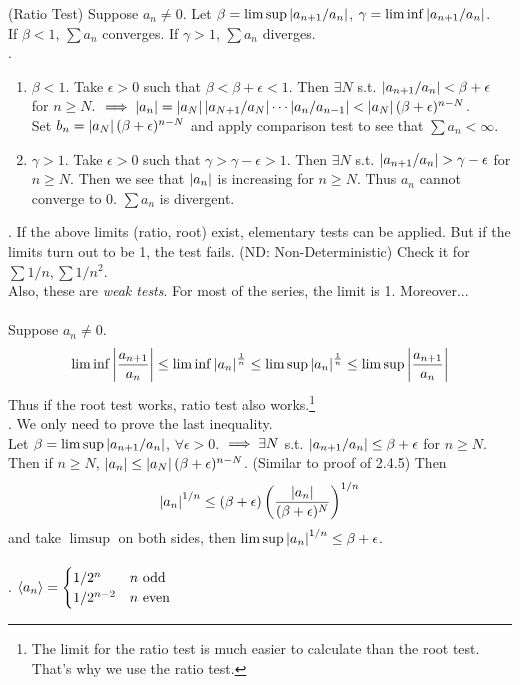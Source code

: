  (Ratio Test) Suppose $a_n \neq 0$. Let $\beta = \limsup \left|a_{n+1}/a_n\right|$, $\gamma = \liminf \left|a_{n+1}/a_n\right|$.\\
If $\beta < 1$, $\sum a_n$ converges. If $\gamma > 1$, $\sum a_n$ diverges.\\
\pf.
\begin{enumerate}
	\item $\beta < 1$. Take $\epsilon>0$ such that $\beta < \beta + \epsilon < 1$. Then $\exists N$ s.t. $\left|a_{n+1}/a_n\right| < \beta + \epsilon$ for $n\geq N$. $\implies \left|a_n\right| = \left|a_N\right| \left|a_{N+1}/a_N\right| \cdots \left|a_n/a_{n-1}\right| < \left|a_N\right|(\beta+\epsilon)^{n-N}$.\\
	Set $b_n = \left|a_N\right|(\beta + \epsilon)^{n-N}$ and apply comparison test to see that $\sum a_n < \infty$.
	\item $\gamma > 1$. Take $\epsilon > 0$ such that $\gamma > \gamma - \epsilon > 1$. Then $\exists N$ s.t. $\left|a_{n+1}/a_n\right| > \gamma - \epsilon$ for $n\geq N$. Then we see that $\left|a_n\right|$ is increasing for $n\geq N$. Thus $a_n$ cannot converge to 0. $\sum a_n$ is divergent.
\end{enumerate}
\rmk. If the above limits (ratio, root) exist, elementary tests can be applied. But if the limits turn out to be 1, the test fails. (ND: Non-Deterministic) Check it for $\sum 1/n, \sum 1/n^2$.\\
Also, these are \textit{weak tests}. For most of the series, the limit is 1. Moreover...\\
\\
 Suppose $a_n \neq 0$. $$\liminf \left|\frac{a_{n+1}}{a_n}\right| \leq \liminf \left|a_n\right|^{\frac{1}{n}} \leq \limsup \left|a_n\right|^{\frac{1}{n}}  \leq \limsup \left|\frac{a_{n+1}}{a_n}\right|$$ Thus if the root test works, ratio test also works.\footnote{The limit for the ratio test is much easier to calculate than the root test. That's why we use the ratio test.}\\
\pf. We only need to prove the last inequality.\\
Let $\beta =  \limsup\left|a_{n+1}/a_n\right| $, $\forall \epsilon > 0$. $\implies\exists N$ s.t. $\left|a_{n+1}/a_n\right| \leq \beta + \epsilon$ for $n\geq N$. Then if $n\geq N$, $\left|a_n\right| \leq \left|a_N\right|(\beta+\epsilon)^{n-N}$. (Similar to proof of 2.4.5) Then $$\left|a_n\right|^{1/n} \leq (\beta + \epsilon) \left(\frac{\left|a_n\right|}{(\beta +\epsilon)^N}\right)^{1/n}$$ and take $\limsup$ on both sides, then $\limsup \left|a_n\right|^{1/n} \leq \beta + \epsilon$.\\
\\
\ex. $\left\langle a_n \right\rangle = \begin{cases}
	1/2^{n} & n \text{ odd}\\
	1/2^{n-2} & n \text{ even}
\end{cases}$\\
